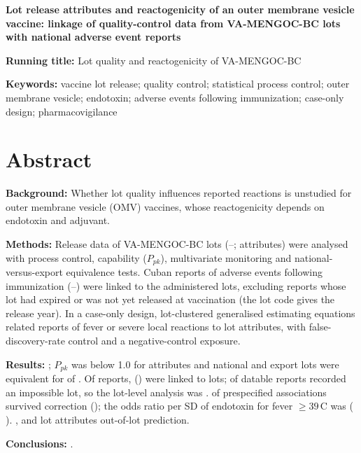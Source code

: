 \documentclass[11pt]{article}
\begin{document}
\begin{titlepage}
\SyntheticNotice
\begin{center}
{\LARGE\bfseries Lot release attributes and reactogenicity of an outer membrane vesicle vaccine:
linkage of quality-control data from \PTNLots{} VA-MENGOC-BC lots with national adverse event
reports\par}
\bigskip
\AuthorBlock
\end{center}
\bigskip
\noindent\textbf{Running title:} Lot quality and reactogenicity of VA-MENGOC-BC\par
\noindent\textbf{Keywords:} vaccine lot release; quality control; statistical process control;
outer membrane vesicle; endotoxin; adverse events following immunization; case-only design;
pharmacovigilance\par
\end{titlepage}

\linenumbers

\section*{Abstract}
\noindent\textbf{Background:} Whether lot quality influences reported reactions is unstudied for
outer membrane vesicle (OMV) vaccines, whose reactogenicity depends on endotoxin and adjuvant.\par
\noindent\textbf{Methods:} Release data of \PTNLots{} VA-MENGOC-BC lots (\PTLotFirstYear--\PTLotLastYear;
\PTNAttributes{} attributes) were analysed with process control, capability ($P_{pk}$),
multivariate monitoring and national-versus-export equivalence tests.
Cuban reports of adverse events following immunization (\VStudyFirstYear--\VStudyLastYear) were
linked to the administered lots, excluding reports whose lot had expired or was not yet released at
vaccination (the lot code gives the release year). In a case-only design, lot-clustered generalised
estimating equations related reports of fever or severe local reactions to lot attributes, with
false-discovery-rate control and a negative-control exposure.\par
\noindent\textbf{Results:} \PTConformitySentence; $P_{pk}$ was below 1.0 for \PTNAttrPpkBelowOne{}
attributes and national and export lots were equivalent for \PTNEquivalent{} of \PTNAttributes.
Of \PTNTargetReports{} reports, \PTNLinked{} (\PTLinkRate) were linked to \PTNLinkedLots{} lots;
\PTLotInconsistentPct{} of datable reports recorded an impossible lot, so the lot-level analysis was
\PTFeasibilityWord.
\PTNSignificantFDR{} of \PTNPrimaryTests{} prespecified associations survived correction
(\PTSignificantList); the odds ratio per SD of endotoxin for fever ${}\geq39$\,\textdegree{}C was \PTEvFeverThreeNineEndotoxinOR{} (\CI{} \PTEvFeverThreeNineEndotoxinCI).
\PTNegControlSentence, and lot attributes \PTIncrementalWord{} out-of-lot prediction.\par
\noindent\textbf{Conclusions:} \PTConclusionSentence.
\end{document}
